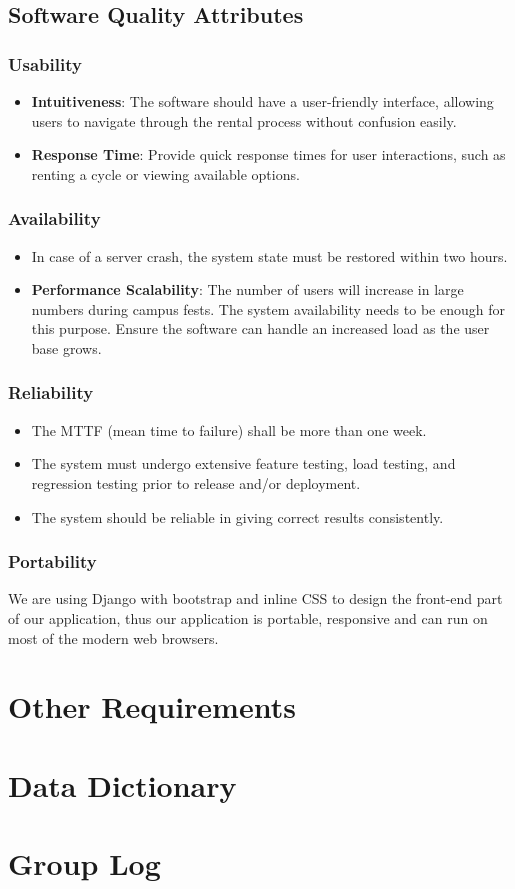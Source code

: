 \documentclass[11pt]{article}
\begin{document}
\subsection{Software Quality Attributes}
\subsubsection{Usability}
\begin{itemize}
    \item \textbf{Intuitiveness}: The software should have a user-friendly interface, allowing users to navigate through the rental process without confusion easily.
    \item \textbf{Response Time}: Provide quick response times for user interactions, such as renting a cycle or viewing available options.
\end{itemize}

\subsubsection{Availability}
\begin{itemize}
    \item In case of a server crash, the system state must be restored within two hours.
    \item \textbf{Performance Scalability}: The number of users will increase in large numbers during campus fests. The system availability needs to be enough for this purpose. Ensure the software can handle an increased load as the user base grows.
\end{itemize}
\subsubsection{Reliability}
\begin{itemize}
    \item The MTTF (mean time to failure) shall be more than one week.
    \item The system must undergo extensive feature testing, load testing, and regression testing prior to release and/or deployment.
    \item The system should be reliable in giving correct results consistently.
\end{itemize}

\subsubsection{Portability}
We are using Django with bootstrap and inline CSS to design the front-end part of our application, thus our application is portable, responsive and can run on most of the modern web browsers.

\newpage
\section{Other Requirements}

\newpage
\section{Data Dictionary}

\newpage
\section{Group Log}
\end{document}
